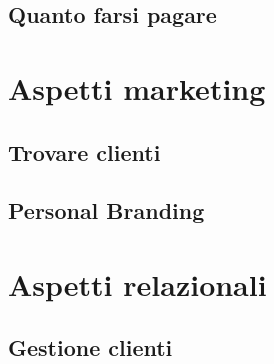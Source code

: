 \documentclass{article}
\begin{document}
\subsection{Quanto farsi pagare}

\section{Aspetti marketing}
\subsection{Trovare clienti}
\subsection{Personal Branding}

\section{Aspetti relazionali}
\subsection{Gestione clienti}
\end{document}
